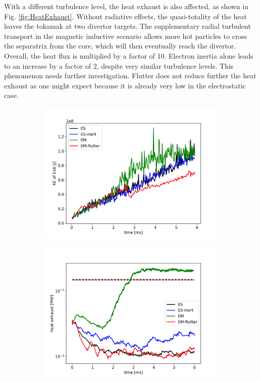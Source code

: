 With a different turbulence level, the heat exhaust is also affected, as shown in Fig. \ref{fig:HeatExhaust}. Without radiative effects, the quasi-totality of the heat leaves the tokamak at two divertor targets. The supplementary radial turbulent transport in the magnetic inductive scenario allows more hot particles to cross the separatrix from the core, which will then eventually reach the divertor. Overall, the heat flux is multiplied by a factor of 10. Electron inertia alone leads to an increase by a factor of 2, despite very similar turbulence levels. This phenomenon needs further investigation. Flutter does not reduce further the heat exhaust as one might expect because it is already very low in the electrostatic case. \newline

\begin{figure}[H]\centering
	\begin{subfigure}[t]{0.45\textwidth}
		\centering
		\includegraphics[width=1\textwidth]{schemes/KE_ExB.jpg}
		\label{fig:KE_ExB}
	\end{subfigure}
	\begin{subfigure}[t]{0.45\textwidth}
		\centering
		\includegraphics[width=1\textwidth]{schemes/heatExhaust_noNeutr.jpg}

\end{subfigure}
\end{figure}
